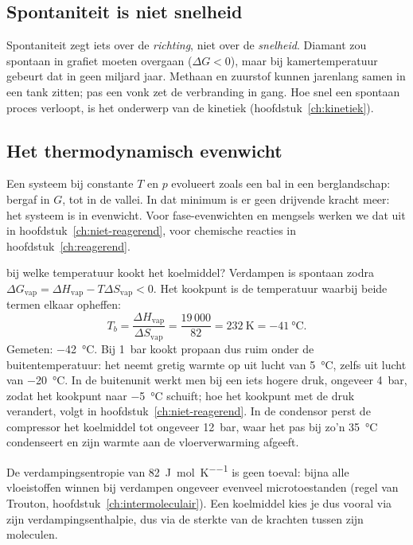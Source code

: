\subsection{Spontaniteit is niet snelheid}

Spontaniteit zegt iets over de \emph{richting}, niet over de \emph{snelheid}. Diamant zou spontaan in grafiet moeten overgaan ($\Delta G < 0$), maar bij kamertemperatuur gebeurt dat in geen miljard jaar. Methaan en zuurstof kunnen jarenlang samen in een tank zitten; pas een vonk zet de verbranding in gang. Hoe snel een spontaan proces verloopt, is het onderwerp van de kinetiek (hoofdstuk~\ref{ch:kinetiek}).

\subsection{Het thermodynamisch evenwicht}

Een systeem bij constante $T$ en $p$ evolueert zoals een bal in een berglandschap: bergaf in $G$, tot in de vallei. In dat minimum is er geen drijvende kracht meer: het systeem is in evenwicht. Voor fase-evenwichten en mengsels werken we dat uit in hoofdstuk~\ref{ch:niet-reagerend}, voor chemische reacties in hoofdstuk~\ref{ch:reagerend}.

\begin{casusuitgewerkt}{bij welke temperatuur kookt het koelmiddel?}
Verdampen is spontaan zodra $\Delta G_\text{vap} = \Delta H_\text{vap} - T\Delta S_\text{vap} < 0$. Het kookpunt is de temperatuur waarbij beide termen elkaar opheffen:
\[
T_b = \frac{\Delta H_\text{vap}}{\Delta S_\text{vap}} = \frac{19\,000}{82} = \SI{232}{\kelvin} = \SI{-41}{\celsius}.
\]
Gemeten: \SI{-42}{\celsius}. Bij \SI{1}{\bar} kookt propaan dus ruim onder de buitentemperatuur: het neemt gretig warmte op uit lucht van \SI{5}{\celsius}, zelfs uit lucht van \SI{-20}{\celsius}. In de buitenunit werkt men bij een iets hogere druk, ongeveer \SI{4}{\bar}, zodat het kookpunt naar \SI{-5}{\celsius} schuift; hoe het kookpunt met de druk verandert, volgt in hoofdstuk~\ref{ch:niet-reagerend}. In de condensor perst de compressor het koelmiddel tot ongeveer \SI{12}{\bar}, waar het pas bij zo'n \SI{35}{\celsius} condenseert en zijn warmte aan de vloerverwarming afgeeft.

De verdampingsentropie van \SI{82}{\joule\per\mole\per\kelvin} is geen toeval: bijna alle vloeistoffen winnen bij verdampen ongeveer evenveel microtoestanden (regel van Trouton, hoofdstuk~\ref{ch:intermoleculair}). Een koelmiddel kies je dus vooral via zijn verdampingsenthalpie, dus via de sterkte van de krachten tussen zijn moleculen.
\end{casusuitgewerkt}


